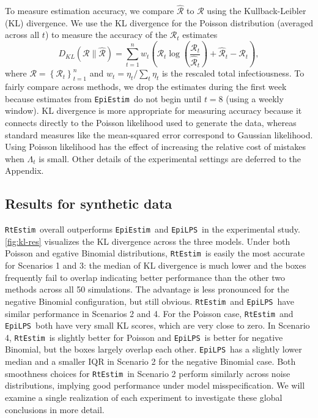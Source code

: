 \documentclass[10pt,letterpaper]{article}
\newcommand{\lr}[1]{\left(#1\right)}
\def\RtEstim{\texttt{RtEstim}}
\def\EpiEstim{\texttt{EpiEstim}}
\def\EpiLPS{\texttt{EpiLPS}}
\def\calR{\mathcal{R}}
\begin{document}
To measure estimation accuracy, we compare $\widehat{\calR}$ to $\calR$ using
the Kullback-Leibler (KL) divergence. We use the KL divergence for the
Poisson distribution (averaged across all $t$) to measure the accuracy
of the $\calR_t$ estimates 
$$D_{KL}(\calR \parallel \widehat{\calR}) = \sum_{t=1}^n w_t \lr{\calR_t
\log\left(\frac{\calR_t} {\widehat{\calR}_t}\right) + \widehat{\calR}_t -
{\calR}_t},$$ where $\calR = \left\{ \calR_t \right\}_{t=1}^n$ and $w_t = \eta_t
/ \sum_t \eta_t$ is the rescaled total infectiousness. To fairly compare across
methods, we drop the estimates during the first week because estimates from
\EpiEstim\ do not begin until $t=8$ (using a weekly window). KL divergence is
more appropriate for measuring accuracy because it connects directly to the
Poisson likelihood used to generate the data, whereas standard measures like the
mean-squared error correspond to Gaussian likelihood. Using Poisson likelihood
has the effect of increasing the relative cost of mistakes when $\Lambda_t$ is
small. Other details of the experimental settings are deferred to the Appendix. 


\subsection{Results for synthetic data}

\RtEstim\ overall outperforms \EpiEstim\ and \EpiLPS\ in the experimental study.
\autoref{fig:kl-res} visualizes the KL divergence across the three models. Under
both Poisson and egative Binomial distributions, \RtEstim\ is easily the most
accurate for Scenarios 1 and 3: the median of KL divergence is much lower and
the boxes frequently fail to overlap indicating better performance than the
other two methods across all 50 simulations. The advantage is less pronounced
for the negative Binomial configuration, but still obvious.
\RtEstim\ and \EpiLPS\ have similar performance in Scenarios 2 and 4. For the
Poisson case, \RtEstim\ and \EpiLPS\ both have very small KL scores, which are
very close to zero. In Scenario 4, \RtEstim\ is slightly better for Poisson and
\EpiLPS\ is better for negative Binomial, but the boxes largely overlap each
other. \EpiLPS\ has a slightly lower median and a smaller IQR in Scenario 2 for
the negative Binomial case. Both smoothness choices for \RtEstim\ in Scenario 2
perform similarly across noise distributions, implying good performance under model misspecification. We will examine a single realization of each
experiment to investigate these global conclusions in more detail.
\end{document}
